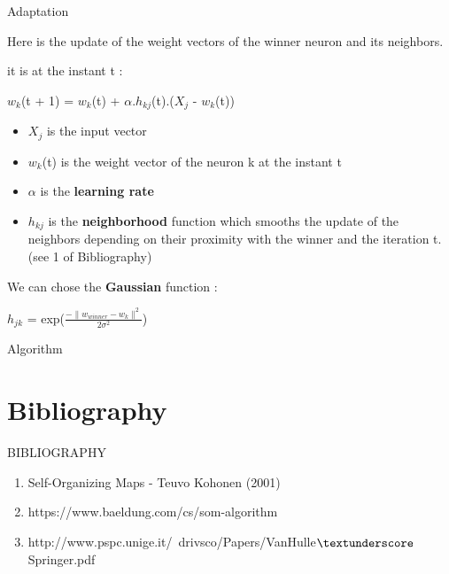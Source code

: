 \documentclass{beamer}
\begin{document}
	\begin{frame}{Adaptation}

Here is the update of the weight vectors of the winner neuron and its neighbors.

it is at the instant t : 

		\begin{center}

			$w_k$(t + 1) = $w_k$(t) + $\alpha$.$h_{kj}$(t).($X_j$ - $w_k$(t))	
		\end{center}

		\begin{itemize}
	
			\item $X_j$ is the input vector
			\item $w_k$(t) is the weight vector of the neuron k at the instant t
			\item $\alpha$ is the \textbf{learning rate}
			\item $h_{kj}$ is the \textbf{neighborhood} function which smooths the update of the neighbors depending on their proximity with the winner and the iteration t. (see 1 of Bibliography)
		\end{itemize}
	
We can chose the \textbf{Gaussian} function :

			\begin{center}
		
				$h_{jk}$ = exp($\frac{-\|w_{winner} - w_k\|^2}{2\sigma^2}$)
			\end{center}
	\end{frame}


	\begin{frame}{Algorithm}
			
		







	
		
	
	\end{frame}
	


\section{Bibliography}
	
	\begin{frame}
	
		\begin{center}

			\Huge BIBLIOGRAPHY
		\end{center}
	\end{frame}


	\begin{frame}
	
		\begin{enumerate}
			
			\item Self-Organizing Maps - Teuvo Kohonen (2001)
			\item https://www.baeldung.com/cs/som-algorithm
			\item http://www.pspc.unige.it/~drivsco/Papers/VanHulle$\textunderscore$Springer.pdf
		\end{enumerate}
	\end{frame}
\end{document}
